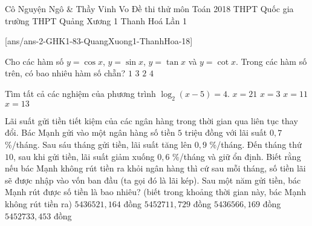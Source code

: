 \begin{name}
{Cô Nguyện Ngô \& Thầy  Vinh Vo}
{Đề thi thử môn Toán 2018 THPT Quốc gia trường THPT Quảng Xương 1 Thanh Hoá Lần 1}
\end{name}
\setcounter{ex}{0}
[ans/ans-2-GHK1-83-QuangXuong1-ThanhHoa-18]
\begin{ex}%
Cho các hàm số $y=\cos x$, $y=\sin x$, $y=\tan x$ và $y=\cot x$. Trong các hàm số trên, có bao nhiêu hàm số chẵn?
    \choice
    {\True $1$}
    {$3$}
    {$2$}
    {$4$}
\end{ex}
\begin{ex}%
Tìm tất cả các nghiệm của phương trình $\log_2(x-5)=4$.
	\choice
	{\True $x=21$}
	{$x=3$}
	{$x=11$}
	{$x=13$}
\end{ex}
\begin{ex}%
Lãi suất gửi tiền tiết kiệm của các ngân hàng trong thời gian qua liên tục thay đổi. Bác Mạnh gửi vào một ngân hàng số tiền $5$ triệu đồng với lãi suất $0{,}7$ \%/tháng. Sau sáu tháng gửi tiền, lãi suất tăng lên $0{,}9$ \%/tháng. Đến tháng thứ $10$, sau khi gửi tiền, lãi suất giảm xuống $0{,}6$ \%/tháng và giữ ổn định. Biết rằng nếu bác Mạnh không rút tiền ra khỏi ngân hàng thì cứ sau mỗi tháng, số tiền lãi sẽ được nhập vào vốn ban đầu (ta gọi đó là lãi kép). Sau một năm gửi tiền, bác Mạnh rút được số tiền là bao nhiêu? (biết trong khoảng thời gian này, bác Mạnh không rút tiền ra)
	\choice
	{$5436521{,}164$ đồng}
	{$5452711{,}729$ đồng}
	{$5436566{,}169$ đồng}
	{\True $5452733{,}453$ đồng}
\end{ex}
